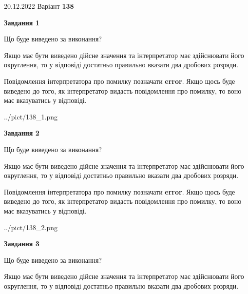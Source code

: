 \documentclass[12pt, ukrainian]{article}
\begin{document}
{20.12.2022 Варіант \No \textbf { 138 }\par}
{
\begin {Large}

{\begin {center}\textbf{Завдання 1}\end {center}}\par
Що буде виведено за виконання? \par

Якщо має бути виведено дійсне значення та інтерпретатор має здійснювати його округлення, 
то у відповіді достатньо правильно вказати два дробових розряди.

Повідомлення інтерпретатора про помилку позначати \textbf{error}.
Якщо щось буде виведено до того, як інтерпретатор видасть повідомлення про помилку, 
то воно має вказуватись у відповіді. \par

\begin{center}
	{../pict/138_1.png}
\end{center}
\newpage

{\begin {center}\textbf{Завдання 2}\end {center}}\par
Що буде виведено за виконання? \par

Якщо має бути виведено дійсне значення та інтерпретатор має здійснювати його округлення, 
то у відповіді достатньо правильно вказати два дробових розряди.

Повідомлення інтерпретатора про помилку позначати \textbf{error}.
Якщо щось буде виведено до того, як інтерпретатор видасть повідомлення про помилку, 
то воно має вказуватись у відповіді. \par

\begin{center}
	{../pict/138_2.png}
\end{center}
\newpage

{\begin {center}\textbf{Завдання 3}\end {center}}\par
Що буде виведено за виконання? \par

Якщо має бути виведено дійсне значення та інтерпретатор має здійснювати його округлення, 
то у відповіді достатньо правильно вказати два дробових розряди.


\end{Large}}
\end{document}

